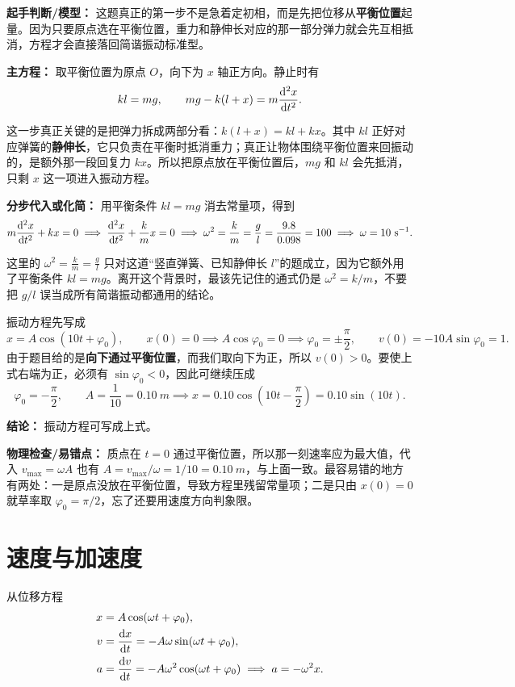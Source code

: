 \documentclass[lang=cn,11pt]{elegantbook}
\begin{document}
\begin{solution}
\textbf{起手判断/模型：} 这题真正的第一步不是急着定初相，而是先把位移从\textbf{平衡位置}起量。因为只要原点选在平衡位置，重力和静伸长对应的那一部分弹力就会先互相抵消，方程才会直接落回简谐振动标准型。

\textbf{主方程：} 取平衡位置为原点 \(O\)，向下为 \(x\) 轴正方向。静止时有
\[
kl=mg,\qquad mg-k(l+x)=m\dv[2]{x}{t}.
\]
\begin{note}
这一步真正关键的是把弹力拆成两部分看：\(k(l+x)=kl+kx\)。其中 \(kl\) 正好对应弹簧的\textbf{静伸长}，它只负责在平衡时抵消重力；真正让物体围绕平衡位置来回振动的，是额外那一段回复力 \(kx\)。所以把原点放在平衡位置后，\(mg\) 和 \(kl\) 会先抵消，只剩 \(x\) 这一项进入振动方程。
\end{note}

\textbf{分步代入或化简：} 用平衡条件 \(kl=mg\) 消去常量项，得到
\[
m\dv[2]{x}{t}+kx=0
\implies \dv[2]{x}{t}+\frac{k}{m}x=0
\implies \omega^2=\frac{k}{m}=\frac{g}{l}=\frac{9.8}{0.098}=100
\implies \omega=10\ \si{s^{-1}}.
\]
\begin{note}
这里的 \(\omega^2=\frac{k}{m}=\frac{g}{l}\) 只对这道“竖直弹簧、已知静伸长 \(l\)”的题成立，因为它额外用了平衡条件 \(kl=mg\)。离开这个背景时，最该先记住的通式仍是 \(\omega^2=k/m\)，不要把 \(g/l\) 误当成所有简谐振动都通用的结论。
\end{note}
振动方程先写成
\[
x=A\cos(10t+\varphi_0),\qquad
x(0)=0 \implies A\cos\varphi_0=0 \implies \varphi_0=\pm\frac{\pi}{2},\qquad
v(0)=-10A\sin\varphi_0=1.
\]
由于题目给的是\textbf{向下通过平衡位置}，而我们取向下为正，所以 \(v(0)>0\)。要使上式右端为正，必须有 \(\sin\varphi_0<0\)，因此可继续压成
\[
\varphi_0=-\frac{\pi}{2},\qquad
A=\frac{1}{10}=0.10\ \si{m}
\implies
x=0.10\cos\left(10t-\frac{\pi}{2}\right)=0.10\sin(10t).
\]

\textbf{结论：} 振动方程可写成上式。

\textbf{物理检查/易错点：} 质点在 \(t=0\) 通过平衡位置，所以那一刻速率应为最大值，代入 \(v_{\max}=\omega A\) 也有 \(A=v_{\max}/\omega=1/10=\SI{0.10}{m}\)，与上面一致。最容易错的地方有两处：一是原点没放在平衡位置，导致方程里残留常量项；二是只由 \(x(0)=0\) 就草率取 \(\varphi_0=\pi/2\)，忘了还要用速度方向判象限。
\end{solution}

\section{速度与加速度}

从位移方程
\[
\begin{aligned}
x&=A\cos(\omega t+\varphi_0),\\
v&=\dv{x}{t}=-A\omega\sin(\omega t+\varphi_0),\\
a&=\dv{v}{t}=-A\omega^2\cos(\omega t+\varphi_0)
\implies a=-\omega^2x.
\end{aligned}
\]
\end{document}
